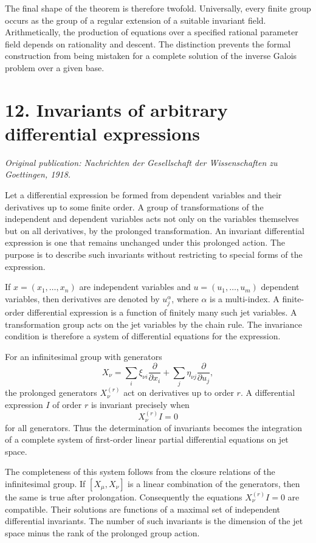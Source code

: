 \documentclass[11pt]{article}
\begin{document}
The final shape of the theorem is therefore twofold. Universally, every finite group occurs as the
group of a regular extension of a suitable invariant field. Arithmetically, the production of
equations over a specified rational parameter field depends on rationality and descent. The
distinction prevents the formal construction from being mistaken for a complete solution of the
inverse Galois problem over a given base.


\section{12. Invariants of arbitrary differential expressions}

\textit{Original publication: Nachrichten der Gesellschaft der Wissenschaften zu Goettingen, 1918.}

Let a differential expression be formed from dependent variables and their derivatives up to some
finite order. A group of transformations of the independent and dependent variables acts not only on
the variables themselves but on all derivatives, by the prolonged transformation. An invariant
differential expression is one that remains unchanged under this prolonged action. The purpose is to
describe such invariants without restricting to special forms of the expression.


If \(x=(x_1, \ldots,x_n)\) are independent variables and \(u=(u_1, \ldots,u_m)\) dependent
variables, then derivatives are denoted by \(u^\alpha_j\), where \(\alpha\) is a multi-index. A
finite-order differential expression is a function of finitely many such jet variables. A
transformation group acts on the jet variables by the chain rule. The invariance condition is
therefore a system of differential equations for the expression.


For an infinitesimal group with generators \[   X_\nu=\sum_i \xi_{\nu i}\frac{\partial}{\partial
x_i}         +\sum_j \eta_{\nu j}\frac{\partial}{\partial u_j}, \] the prolonged generators
\(X_\nu^{(r)}\) act on derivatives up to order \(r\). A differential expression \(I\) of order \(r\)
is invariant precisely when \[   X_\nu^{(r)} I=0 \] for all generators. Thus the determination of
invariants becomes the integration of a complete system of first-order linear partial differential
equations on jet space.


The completeness of this system follows from the closure relations of the infinitesimal group. If
\([X_\mu,X_\nu]\) is a linear combination of the generators, then the same is true after
prolongation. Consequently the equations \(X_\nu^{(r)}I=0\) are compatible. Their solutions are
functions of a maximal set of independent differential invariants. The number of such invariants is
the dimension of the jet space minus the rank of the prolonged group action.
\end{document}
